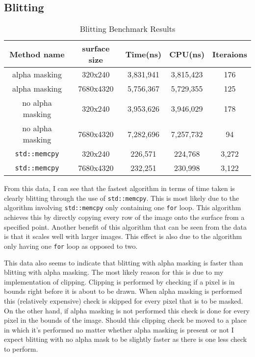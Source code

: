 \documentclass[
	a4paper, %
	10pt, %
]{CSUniSchoolLabReport}
\begin{document}
\subsection{Blitting}
\begin{table}[ht]
	\caption{Blitting Benchmark Results} %
	\centering 
	\begin{tabular}{c c c c c} 
	\hline
	Method name & surface size & Time(ns) & CPU(ns) & Iteraions \\ [0.5ex] 
	\hline
	alpha masking & 320x240 & 3,831,941 & 3,815,423 & 176 \\ 
	alpha masking & 7680x4320 & 5,756,367 & 5,729,355 & 125 \\
	no alpha masking & 320x240 & 3,953,626 & 3,946,029 & 178 \\
	no alpha masking & 7680x4320 & 7,282,696 & 7,257,732 & 94 \\
	\verb|std::memcpy| & 320x240 & 226,571 & 224,768 & 3,272 \\ 
	\verb|std::memcpy| & 7680x4320 & 232,251 & 230,998 & 3,122 \\[1ex] 
	\end{tabular}
\end{table}
\begin{flushleft}
	From this data, I can see that the fastest algorithm in terms of time taken is 
	clearly blitting through the use of \verb|std::memcpy|. This is most likely due
	to the algorithm involving \verb|std::memcpy| only containing one \verb|for| loop.
	This algorithm achieves this by directly copying every row of the image onto
	the surface from a specified point. Another benefit of this algorithm that can be seen from 
	the data is that it scales well with larger images. This effect is also due to the algorithm
	only having one \verb|for| loop as opposed to two.
\end{flushleft}
\begin{flushleft}
	This data also seems to indicate that blitting with alpha masking is faster than
	blitting with alpha masking. The most likely reason for this is due to my implementation 
	of clipping. Clipping is performed by checking if a pixel is in bounds right before it
	is about to be drawn. When alpha masking is performed this (relatively expensive) check 
	is skipped for every pixel that is to be masked. On the other hand, if alpha masking is not 
	performed this check is done for every pixel in the bounds of the image. Should this clipping 
	check be moved to a place in which it's performed no matter whether alpha masking is present or not
	I expect blitting with no alpha mask to be slightly faster as there is one less check to perform.
\end{flushleft}
\end{document}
